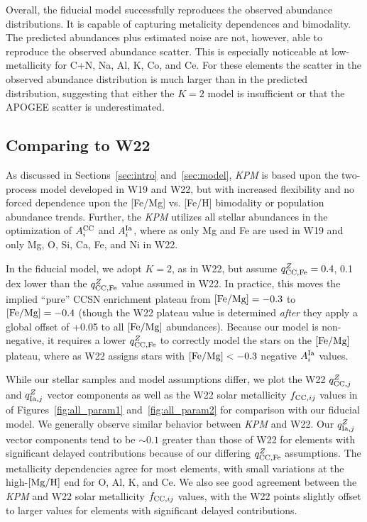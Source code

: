 \documentclass[modern]{aastex631}
\newcommand{\femg}{[{\rm Fe}/{\rm Mg}]}
\newcommand{\mgh}{[{\rm Mg}/{\rm H}]}
\newcommand{\qcc}{q_{{\rm CC,}j}^{Z}}
\newcommand{\qccFe}{q_{{\rm CC, Fe}}^{Z}}
\newcommand{\qIa}{q_{{\rm Ia,}j}^{Z}}
\newcommand{\Acc}{A^{\rm CC}_{i}}
\newcommand{\AIa}{A^{\rm Ia}_{i}}
\newcommand{\fcc}{f_{{\rm CC}, ij}}
\newcommand{\name}{\textsl{KPM}}
\begin{document}
Overall, the fiducial model successfully reproduces the observed abundance distributions. It is capable of capturing metalicity dependences and bimodality. The predicted abundances plus estimated noise are not, however, able to reproduce the observed abundance scatter. This is especially noticeable at low-metallicity for C+N, Na, Al, K, Co, and Ce. For these elements the scatter in the observed abundance distribution is much larger than in the predicted distribution, suggesting that either the $K=2$ model is insufficient or that the APOGEE scatter is underestimated.

\subsection{Comparing to W22}\label{subsec:w22}

As discussed in Sections~\ref{sec:intro} and~\ref{sec:model}, \name{} is based upon the two-process model developed in W19 and W22, but with increased flexibility and no forced dependence upon the [Fe/Mg] vs. [Fe/H] bimodality or population abundance trends. Further, the \name{} utilizes all stellar abundances in the optimization of $\Acc$ and $\AIa$, where as only Mg and Fe are used in W19 and only Mg, O, Si, Ca, Fe, and Ni in W22. 

In the fiducial model, we adopt $K=2$, as in W22, but assume $\qccFe = 0.4$, 0.1 dex lower than the $\qccFe$ value assumed in W22. In practice, this moves the implied ``pure'' CCSN enrichment plateau from $\femg=-0.3$ to $\femg=-0.4$ (though the W22 plateau value is determined \textit{after} they apply a global offset of +0.05 to all $\femg$ abundances). Because our model is non-negative, it requires a lower $\qccFe$ to correctly model the stars on the $\femg$ plateau, where as W22 assigns stars with $\femg < -0.3$ negative $\AIa$ values.

While our stellar samples and model assumptions differ, we plot the W22 $\qcc$ and $\qIa$ vector components as well as the W22 solar metallicity $\fcc$ values in of Figures~\ref{fig:all_param1} and~\ref{fig:all_param2} for comparison with our fiducial model. We generally observe similar behavior between \name{} and W22. Our $\qIa$ vector components tend to be $\sim 0.1$ greater than those of W22 for elements with significant delayed contributions because of our differing $\qccFe$ assumptions. The metallicity dependencies agree for most elements, with small variations at the high-$\mgh$ end for O, Al, K, and Ce. We also see good agreement between the \name{} and W22 solar metallicity $\fcc$ values, with the W22 points slightly offset to larger values for elements with significant delayed contributions.
\end{document}
